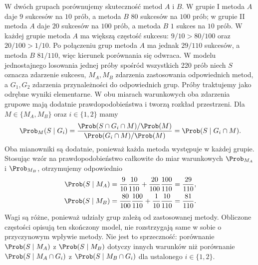 \begin{przyklad}
W dwóch grupach porównujemy skuteczność metod $A$ i $B$.
W grupie I metoda $A$ daje $9$ sukcesów na $10$ prób, a metoda $B$
$80$ sukcesów na $100$ prób; w grupie II metoda $A$ daje
$20$ sukcesów na $100$ prób, a metoda $B$ $1$ sukces na $10$ prób.
W każdej grupie metoda $A$ ma większą częstość sukcesu:
$9/10>80/100$ oraz $20/100>1/10$.
Po połączeniu grup metoda $A$ ma jednak $29/110$ sukcesów,
a metoda $B$ $81/110$, więc kierunek porównania się odwraca.
W modelu jednostajnego losowania jednej próby spośród wszystkich
220 prób niech $S$ oznacza zdarzenie sukcesu, $M_A,M_B$
zdarzenia zastosowania odpowiednich metod, a $G_1,G_2$
zdarzenia przynależności do odpowiednich grup.
Próby traktujemy jako odrębne wyniki elementarne.
W obu miarach warunkowych oba zdarzenia grupowe mają
dodatnie prawdopodobieństwa i tworzą rozkład przestrzeni.
Dla $M\in\{M_A,M_B\}$ oraz $i\in\{1,2\}$ mamy
\[
\Prob_M(S\mid G_i)
=\frac{\Prob(S\cap G_i\cap M)/\Prob(M)}
{\Prob(G_i\cap M)/\Prob(M)}
=\Prob(S\mid G_i\cap M).
\]
Oba mianowniki są dodatnie, ponieważ każda metoda
występuje w każdej grupie. Stosując wzór na prawdopodobieństwo
całkowite do miar warunkowych $\Prob_{M_A}$ i $\Prob_{M_B}$,
otrzymujemy odpowiednio
\begin{align*}
\Prob(S\mid M_A)&=\frac9{10}\frac{10}{110}
+\frac{20}{100}\frac{100}{110}=\frac{29}{110},\\
\Prob(S\mid M_B)&=\frac{80}{100}\frac{100}{110}
+\frac1{10}\frac{10}{110}=\frac{81}{110}.
\end{align*}
Wagi są różne, ponieważ udziały grup zależą od zastosowanej
metody. Obliczone częstości opisują ten skończony model,
nie rozstrzygają same w sobie o przyczynowym wpływie metody.
Nie jest to sprzeczność: porównanie $\Prob(S\mid M_A)$
z $\Prob(S\mid M_B)$ dotyczy innych warunków niż porównanie
$\Prob(S\mid M_A\cap G_i)$ z $\Prob(S\mid M_B\cap G_i)$
dla ustalonego $i\in\{1,2\}$.
\end{przyklad}

